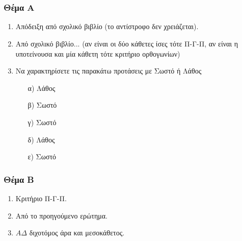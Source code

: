 \documentclass[12pt]{article}
\begin{document}
\part*{}

\section*{Θέμα Α}
  \noindent
  \begin{enumerate}
    \item Απόδειξη από σχολικό βιβλίο (το αντίστροφο δεν χρειάζεται).
    \item Από σχολικό βιβλίο... (αν είναι οι δύο κάθετες ίσες τότε Π-Γ-Π, αν είναι η υποτείνουσα και μία κάθετη τότε κριτήριο ορθογωνίων)
    \item Να χαρακτηρίσετε τις παρακάτω προτάσεις με Σωστό ή Λάθος
    \begin{enumerate}
      \item [α)] Λάθος
      \item [β)] Σωστό
      \item [γ)] Σωστό
      \item [δ)] Λάθος
      \item [ε)] Σωστό
    \end{enumerate}
  \end{enumerate}

\section*{Θέμα Β}
  \noindent
  \begin{enumerate}
    \item Κριτήριο Π-Γ-Π.
    \item Από το προηγούμενο ερώτημα.
    \item $ΑΔ$ διχοτόμος άρα και μεσοκάθετος.
  \end{enumerate}
\end{document}
